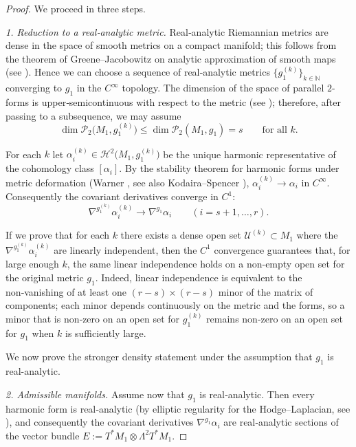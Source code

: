 \documentclass[11pt,reqno]{amsart}
\theoremstyle{plain}
\theoremstyle{definition}
\numberwithin{equation}{section}
\begin{document}
\begin{proof}
We proceed in three steps.

\noindent\textit{1.  Reduction to a real‑analytic metric.}
Real‑analytic Riemannian metrics are dense in the space of smooth metrics on a compact manifold; this follows from the theorem of Greene--Jacobowitz on analytic approximation of smooth maps (see \cite{GreeneJacobowitz}).  Hence we can choose a sequence of real‑analytic metrics \(\{g_1^{(k)}\}_{k\in\mathbb N}\) converging to \(g_1\) in the \(C^\infty\) topology.  
The dimension of the space of parallel \(2\)-forms is upper‑semicontinuous with respect to the metric (see \cite{B (1987)}); therefore, after passing to a subsequence, we may assume
\[
\dim\mathcal{P}_2\bigl(M_1,g_1^{(k)}\bigr)\le\dim\mathcal{P}_2(M_1,g_1)=s\qquad\text{for all }k .
\]

For each \(k\) let \(\alpha_i^{(k)}\in\mathcal{H}^2\bigl(M_1,g_1^{(k)}\bigr)\) be the unique harmonic representative of the cohomology class \([\alpha_i]\).  By the stability theorem for harmonic forms under metric deformation (Warner \cite{W (1983)}, see also Kodaira--Spencer \cite{K-S (1960)}), \(\alpha_i^{(k)}\to\alpha_i\) in \(C^\infty\).  Consequently the covariant derivatives converge in \(C^1\):
\[
\nabla^{g_1^{(k)}}\alpha_i^{(k)}\longrightarrow\nabla^{g_1}\alpha_i\qquad (i=s+1,\dots,r).
\]

If we prove that for each \(k\) there exists a dense open set \(\mathcal{U}^{(k)}\subset M_1\) where the \(\nabla^{g_1^{(k)}}\alpha_i^{(k)}\) are linearly independent, then the \(C^1\) convergence guarantees that, for large enough \(k\), the same linear independence holds on a non-empty open set for the original metric \(g_1\).  Indeed, linear independence is equivalent to the non‑vanishing of at least one \((r-s)\times(r-s)\) minor of the matrix of components; each minor depends continuously on the metric and the forms, so a minor that is non‑zero on an open set for \(g_1^{(k)}\) remains non‑zero on an open set for \(g_1\) when \(k\) is sufficiently large.

We now prove the stronger density statement under the assumption that $g_1$ is real-analytic.

\noindent \textit{2.   Admissible manifolds.}
Assume now that $g_1$ is real‑analytic.  Then every harmonic form is real‑analytic (by elliptic regularity for the Hodge–Laplacian, see \cite{MorreyNirenberg}), and consequently the covariant derivatives $\nabla^{g_1}\alpha_i$ are real‑analytic sections of the vector bundle $E:=T^*M_1\otimes\Lambda^2T^*M_1$.


\end{proof}
\end{document}
